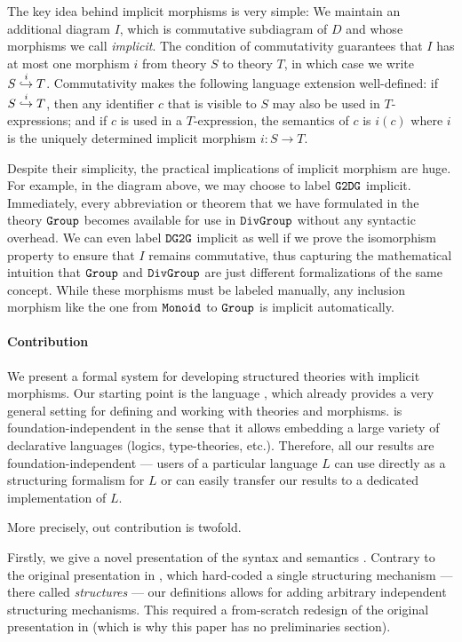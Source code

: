 The key idea behind implicit morphisms is very simple:
We maintain an additional diagram $I$, which is commutative subdiagram of $D$ and whose morphisms we call \emph{implicit}.
The condition of commutativity guarantees that $I$ has at most one morphism $i$ from theory $S$ to theory $T$, in which case we write $\ipc{i}{S}{T}$.
Commutativity makes the following language extension well-defined: if $\ipc{i}{S}{T}$, then any identifier $c$ that is visible to $S$ may also be used in $T$-expressions; and if $c$ is used in a $T$-expression, the semantics of $c$ is $i(c)$ where $i$ is the uniquely determined implicit morphism $i:S\to T$.

Despite their simplicity, the practical implications of implicit morphism are huge.
For example, in the diagram above, we may choose to label $\cn{G2DG}$ implicit.
Immediately, every abbreviation or theorem that we have formulated in the theory $\cn{Group}$ becomes available for use in $\cn{DivGroup}$ without any syntactic overhead.
We can even label $\cn{DG2G}$ implicit as well if we prove the isomorphism property to ensure that $I$ remains commutative, thus capturing the mathematical intuition that $\cn{Group}$ and $\cn{DivGroup}$ are just different formalizations of the same concept.
While these morphisms must be labeled manually, any inclusion morphism like the one from $\cn{Monoid}$ to $\cn{Group}$ is implicit automatically.

\paragraph{Contribution}
We present a formal system for developing structured theories with implicit morphisms.
Our starting point is the \mmt language \cite{RK:mmt:10}, which already provides a very general setting for defining and working with theories and morphisms.
\mmt is foundation-independent in the sense that it allows embedding a large variety of declarative languages (logics, type-theories, etc.).
Therefore, all our results are foundation-independent --- users of a particular language $L$ can use \mmt directly as a structuring formalism for $L$ or can easily transfer our results to a dedicated implementation of $L$.

More precisely, out contribution is twofold.
\medskip

Firstly, we give a novel presentation of the syntax and semantics \mmt.
Contrary to the original presentation in \cite{RK:mmt:10}, which hard-coded a single structuring mechanism --- there called \textit{structures} --- our definitions allows for adding arbitrary independent structuring mechanisms.
This required a from-scratch redesign of the original presentation in \cite{RK:mmt:10} (which is why this paper has no preliminaries section).

